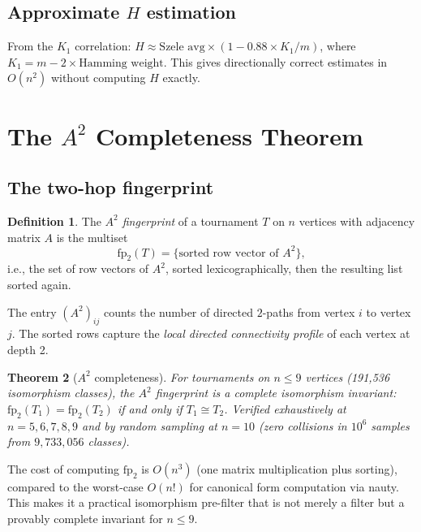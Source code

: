 \documentclass[11pt,a4paper]{article}
\newtheorem{theorem}{Theorem}[section]
\theoremstyle{definition}
\newtheorem{definition}[theorem]{Definition}
\theoremstyle{remark}
\begin{document}
\subsection{Approximate $H$ estimation}

From the $K_1$ correlation: $H \approx \text{Szele avg} \times (1 - 0.88 \times K_1/m)$, where $K_1 = m - 2 \times \text{Hamming weight}$. This gives directionally correct estimates in $O(n^2)$ without computing $H$ exactly.

\section{The $A^2$ Completeness Theorem}
\label{sec:a2}

\subsection{The two-hop fingerprint}

\begin{definition}
The \emph{$A^2$ fingerprint} of a tournament $T$ on $n$ vertices with adjacency matrix $A$ is the multiset
\[
\mathrm{fp}_2(T) = \bigl\{ \text{sorted row vector of } A^2 \bigr\},
\]
i.e., the set of row vectors of $A^2$, sorted lexicographically, then the resulting list sorted again.
\end{definition}

The entry $(A^2)_{ij}$ counts the number of directed $2$-paths from vertex $i$ to vertex $j$. The sorted rows capture the \emph{local directed connectivity profile} of each vertex at depth 2.

\begin{theorem}[$A^2$ completeness]
\label{thm:a2complete}
For tournaments on $n \leq 9$ vertices (191{,}536 isomorphism classes), the $A^2$ fingerprint is a \emph{complete isomorphism invariant}: $\mathrm{fp}_2(T_1) = \mathrm{fp}_2(T_2)$ if and only if $T_1 \cong T_2$. Verified exhaustively at $n = 5, 6, 7, 8, 9$ and by random sampling at $n = 10$ (zero collisions in $10^6$ samples from $9{,}733{,}056$ classes).
\end{theorem}

The cost of computing $\mathrm{fp}_2$ is $O(n^3)$ (one matrix multiplication plus sorting), compared to the worst-case $O(n!)$ for canonical form computation via nauty. This makes it a practical isomorphism pre-filter that is not merely a filter but a provably complete invariant for $n \leq 9$.
\end{document}
